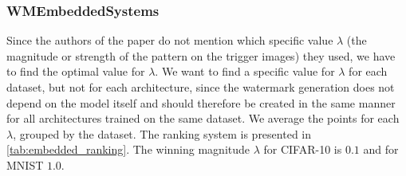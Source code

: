 




%



\subsubsection{WMEmbeddedSystems}
\label{sec:eval-param:embedded}

Since the authors of the paper do not mention which specific value $\lambda$ (the magnitude or strength of the pattern on the trigger images) they used, we have to find the optimal value for $\lambda$. We want to find a specific value for $\lambda$ for each dataset, but not for each architecture, since the watermark generation does not depend on the model itself and should therefore be created in the same manner for all architectures trained on the same dataset. We average the points for each $\lambda$, grouped by the dataset. The ranking system is presented in \cref{tab:embedded_ranking}. The winning magnitude $\lambda$ for CIFAR-10 is $0.1$ and for MNIST $1.0$.






